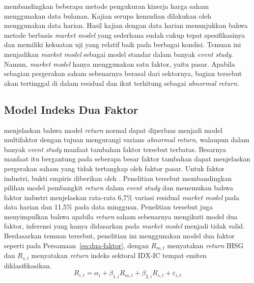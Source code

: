 \textcite{brown1980} membandingkan beberapa metode pengukuran kinerja harga saham menggunakan data bulanan. Kajian serupa kemudian dilakukan oleh \textcite{brown1985} menggunakan data harian. Hasil kajian dengan data harian menunjukkan bahwa metode berbasis \emph{market model} yang sederhana sudah cukup tepat spesifikasinya dan memiliki kekuatan uji yang relatif baik pada berbagai kondisi. Temuan ini menjadikan \emph{market model} sebagai model standar dalam banyak \emph{event study}. Namun, \emph{market model} hanya menggunakan satu faktor, yaitu pasar. Apabila sebagian pergerakan saham sebenarnya berasal dari sektornya, bagian tersebut akan tertinggal di dalam residual dan ikut terhitung sebagai \emph{abnormal return}.

\subsection{Model Indeks Dua Faktor}

\textcite{mackinlay1997} menjelaskan bahwa model \emph{return} normal dapat diperluas menjadi model multifaktor dengan tujuan mengurangi varians \emph{abnormal return}, walaupun dalam banyak \emph{event study} manfaat tambahan faktor tersebut terbatas. Besarnya manfaat itu bergantung pada seberapa besar faktor tambahan dapat menjelaskan pergerakan saham yang tidak tertangkap oleh faktor pasar. Untuk faktor industri, bukti empiris diberikan oleh \textcite{xiang1993}. Penelitian tersebut membandingkan pilihan model pembangkit \emph{return} dalam \emph{event study} dan menemukan bahwa faktor industri menjelaskan rata-rata 6,7\% variasi residual \emph{market model} pada data harian dan 11,5\% pada data mingguan. Penelitian tersebut juga menyimpulkan bahwa apabila \emph{return} saham sebenarnya mengikuti model dua faktor, inferensi yang hanya didasarkan pada \emph{market model} menjadi tidak valid. Berdasarkan temuan tersebut, penelitian ini menggunakan model dua faktor seperti pada Persamaan~\ref{eq:dua-faktor}, dengan $R_{m,t}$ menyatakan \emph{return} IHSG dan $R_{s,t}$ menyatakan \emph{return} indeks sektoral IDX-IC tempat emiten diklasifikasikan.
\begin{equation}
R_{i,t} = \alpha_i + \beta_{1,i} R_{m,t} + \beta_{2,i} R_{s,t} + \varepsilon_{i,t}
\label{eq:dua-faktor}
\end{equation}

